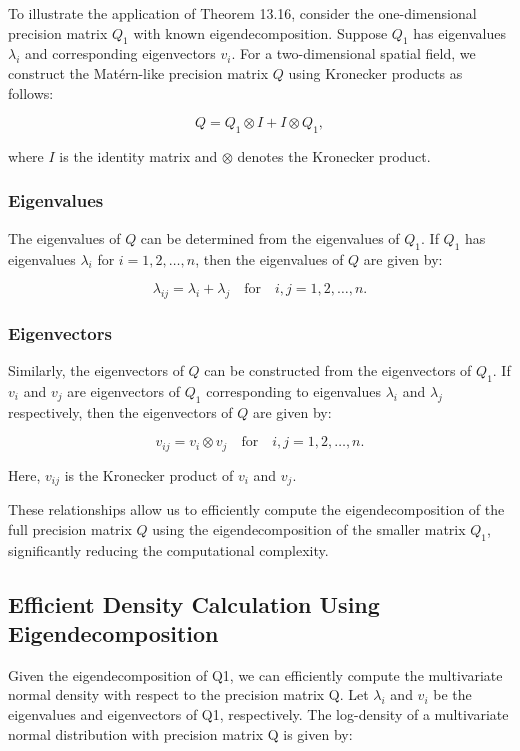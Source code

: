 \documentclass[journal=,manuscript=]{achemso}
\begin{document}
To illustrate the application of Theorem 13.16, consider the
one-dimensional precision matrix \(Q_1\) with known eigendecomposition.
Suppose \(Q_1\) has eigenvalues \(\lambda_i\) and corresponding
eigenvectors \(v_i\). For a two-dimensional spatial field, we construct
the Matérn-like precision matrix \(Q\) using Kronecker products as
follows:

\[
Q = Q_1 \otimes I + I \otimes Q_1,
\]

where \(I\) is the identity matrix and \(\otimes\) denotes the Kronecker
product.

\subsubsection{Eigenvalues}\label{eigenvalues}

The eigenvalues of \(Q\) can be determined from the eigenvalues of
\(Q_1\). If \(Q_1\) has eigenvalues \(\lambda_i\) for
\(i = 1, 2, \ldots, n\), then the eigenvalues of \(Q\) are given by:

\[
\lambda_{ij} = \lambda_i + \lambda_j \quad \text{for} \quad i, j = 1, 2, \ldots, n.
\]

\subsubsection{Eigenvectors}\label{eigenvectors}

Similarly, the eigenvectors of \(Q\) can be constructed from the
eigenvectors of \(Q_1\). If \(v_i\) and \(v_j\) are eigenvectors of
\(Q_1\) corresponding to eigenvalues \(\lambda_i\) and \(\lambda_j\)
respectively, then the eigenvectors of \(Q\) are given by:

\[
v_{ij} = v_i \otimes v_j \quad \text{for} \quad i, j = 1, 2, \ldots, n.
\]

Here, \(v_{ij}\) is the Kronecker product of \(v_i\) and \(v_j\).

These relationships allow us to efficiently compute the
eigendecomposition of the full precision matrix \(Q\) using the
eigendecomposition of the smaller matrix \(Q_1\), significantly reducing
the computational complexity.

\subsection{Efficient Density Calculation Using
Eigendecomposition}\label{efficient-density-calculation-using-eigendecomposition}

Given the eigendecomposition of Q1, we can efficiently compute the
multivariate normal density with respect to the precision matrix Q. Let
\(\lambda_i\) and \(v_i\) be the eigenvalues and eigenvectors of Q1,
respectively. The log-density of a multivariate normal distribution with
precision matrix Q is given by:
\end{document}
